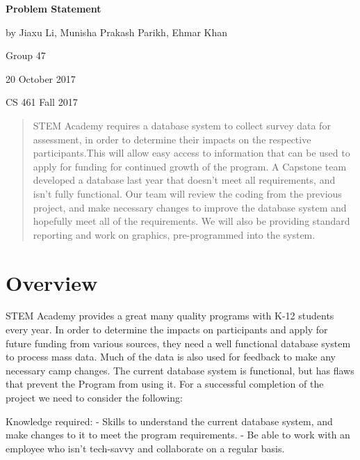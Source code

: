\documentclass[onecolumn, draftclsnofoot,10pt, compsoc]{IEEEtran}
\begin{document}
\begin{titlepage}
		
		\begin{center}
		\bigbreak	
		\textbf{Problem Statement}
	
  	by Jiaxu Li, Munisha Prakash Parikh, Ehmar Khan

  	  Group 47

  	  20 October 2017
   
		 CS 461 Fall 2017
    
   		\end{center}
        \begin{abstract}
        STEM Academy requires a database system to collect survey data for assessment, in order to determine their impacts on the respective participants.This will allow easy access to information that can be used to apply for funding for continued growth of the program. A Capstone team developed a database last year that doesn't meet all requirements, and isn't fully functional. Our team will review the coding from the previous project, and make necessary changes to improve the database system and hopefully meet all of the requirements. We will also be providing standard reporting and work on graphics, pre-programmed into the system.
        \end{abstract}     
\end{titlepage}
\newpage
{}
\clearpage

\section{Overview}
STEM Academy provides a great many quality programs with K-12 students every year. In order to determine the impacts on participants and apply for future funding from various sources, they need a well functional database system to process mass data. Much of the data is also used for feedback to make any necessary camp changes. The current database system is functional, but has flaws that prevent the Program from using it. For a successful completion of the project we need to consider the following:
\newline \newline

Knowledge required: \newline
- Skills to understand the current database system, and make changes to it to meet the program requirements. \newline
- Be able to work with an employee who isn\rq t tech-savvy and collaborate on a regular basis.\newline\newline
\end{document}
